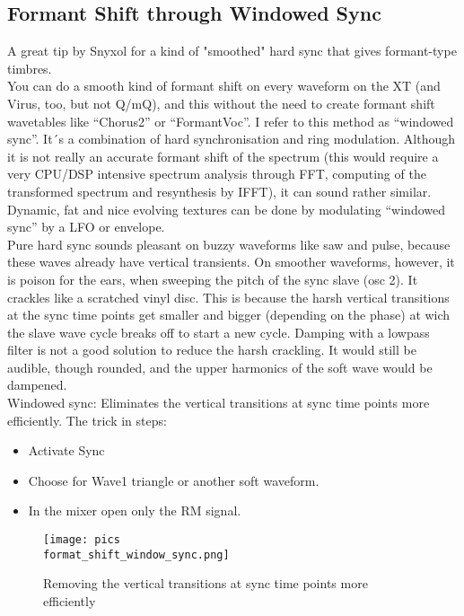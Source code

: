\subsection{Formant Shift through Windowed Sync}
A great tip by Snyxol for a kind of "smoothed" hard sync that gives formant-type timbres.\\
You can do a smooth kind of formant shift on every waveform on the XT (and Virus, too, but not Q/mQ), and this without the need to create formant shift wavetables like “Chorus2” or “FormantVoc”. I refer to this method as “windowed sync”. It´s a combination of hard synchronisation and ring modulation. Although it is not really an accurate formant shift of the spectrum (this would require a very CPU/DSP intensive spectrum analysis through FFT, computing of the transformed spectrum and resynthesis by IFFT), it can sound rather similar. Dynamic, fat and nice evolving textures can be done by modulating “windowed sync” by a LFO or envelope.\\
Pure hard sync sounds pleasant on buzzy waveforms like saw and pulse, because these waves already have vertical transients. On smoother waveforms, however, it is poison for the ears, when sweeping the pitch of the sync slave (osc 2). It crackles like a scratched vinyl disc. This is because the harsh vertical transitions at the sync time points get smaller and bigger (depending on the phase) at wich the slave wave cycle breaks off to start a new cycle. Damping with a lowpass filter is not a good solution to reduce the harsh crackling. It would still be audible, though rounded, and the upper harmonics of the soft wave would be dampened.\\
Windowed sync: Eliminates the vertical transitions at sync time points more efficiently. The trick in steps:
\begin{itemize}
	\item Activate Sync
	\item Choose for Wave1 triangle or another soft waveform.
	\item In the mixer open only the RM signal.
\end{itemize}
\bigskip %
%
\begin{figure}[ht!]
	\centering
	\texttt{[image: pics\\format\_shift\_window\_sync.png]}
	\caption{Removing the vertical transitions at sync time points more efficiently}
	\label{Formatshift_window_sync}
\end{figure}
